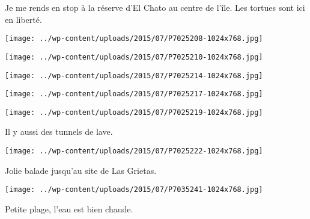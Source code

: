  

 Je me rends en stop à la réserve d'El Chato au centre de l'île. Les tortues sont ici en liberté. 

 

\begin{center} \texttt{[image: ../wp-content/uploads/2015/07/P7025208-1024x768.jpg]} \end{center}

 

 

\begin{center} \texttt{[image: ../wp-content/uploads/2015/07/P7025210-1024x768.jpg]} \end{center}

 

 

\begin{center} \texttt{[image: ../wp-content/uploads/2015/07/P7025214-1024x768.jpg]} \end{center}

 

 

\begin{center} \texttt{[image: ../wp-content/uploads/2015/07/P7025217-1024x768.jpg]} \end{center}



\begin{center} \texttt{[image: ../wp-content/uploads/2015/07/P7025219-1024x768.jpg]} \end{center}

 

 Il y aussi des tunnels de lave. 

 

\begin{center} \texttt{[image: ../wp-content/uploads/2015/07/P7025222-1024x768.jpg]} \end{center}

 

 Jolie balade jusqu'au site de Las Grietas. 

 

\begin{center} \texttt{[image: ../wp-content/uploads/2015/07/P7035241-1024x768.jpg]} \end{center}

 

 Petite plage, l'eau est bien chaude. 

